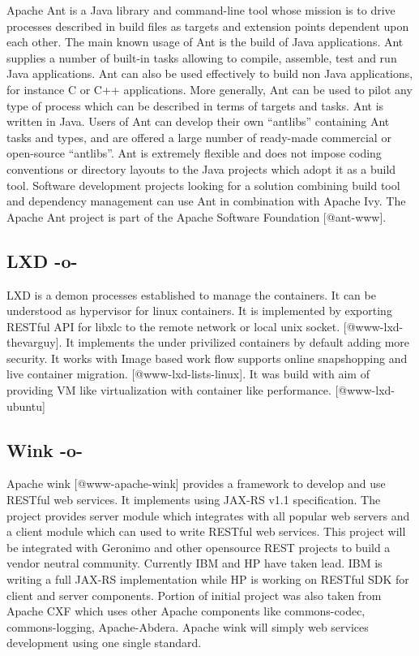 Apache Ant is a Java library and command-line tool whose mission is to
drive processes described in build files as targets and extension
points dependent upon each other. The main known usage of Ant is the
build of Java applications. Ant supplies a number of built-in tasks
allowing to compile, assemble, test and run Java applications. Ant can
also be used effectively to build non Java applications, for instance
C or C++ applications. More generally, Ant can be used to pilot any
type of process which can be described in terms of targets and
tasks. Ant is written in Java. Users of Ant can develop their own
``antlibs'' containing Ant tasks and types, and are offered a large
number of ready-made commercial or open-source ``antlibs''. Ant is
extremely flexible and does not impose coding conventions or directory
layouts to the Java projects which adopt it as a build tool. Software
development projects looking for a solution combining build tool and
dependency management can use Ant in combination with Apache Ivy. The
Apache Ant project is part of the Apache Software
Foundation [@ant-www].

\subsection{LXD -o-}

LXD is a demon processes established to manage the containers. It can
be understood as hypervisor for linux containers. It is implemented by
exporting RESTful API for libxlc to the remote network or local unix
socket. [@www-lxd-thevarguy]. It implements the under privilized
containers by default adding more security. It works with Image based
work flow supports online snapshopping and live container
migration. [@www-lxd-lists-linux]. It was build with aim of
providing VM like virtualization with container like
performance. [@www-lxd-ubuntu]

\subsection{Wink -o-}

Apache wink [@www-apache-wink] provides a framework to develop and
use RESTful web services. It implements using JAX-RS v1.1
specification. The project provides server module which integrates
with all popular web servers and a client module which can used to
write RESTful web services. This project will be integrated with
Geronimo and other opensource REST projects to build a vendor neutral
community. Currently IBM and HP have taken lead. IBM is writing a full
JAX-RS implementation while HP is working on RESTful SDK for client
and server components.  Portion of initial project was also taken from
Apache CXF which uses other Apache components like commons-codec,
commons-logging, Apache-Abdera. Apache wink will simply web services
development using one single standard.

